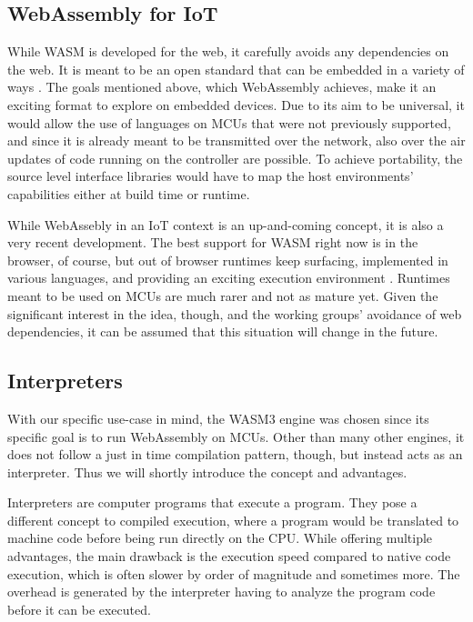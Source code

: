 \subsection{WebAssembly for IoT}

While WASM is developed for the web, it carefully avoids any dependencies on the web. It is meant to be an open standard that can be embedded in a variety of ways \autocite{noauthor_non-web_nodate}. The goals mentioned above, which WebAssembly achieves, make it an exciting format to explore on embedded devices. Due to its aim to be universal, it would allow the use of languages on MCUs that were not previously supported, and since it is already meant to be transmitted over the network, also over the air updates of code running on the controller are possible. To achieve portability, the source level interface libraries would have to map the host environments' capabilities either at build time or runtime.

While WebAssebly in an IoT context is an up-and-coming concept, it is also a very recent development. The best support for WASM right now is in the browser, of course, but out of browser runtimes keep surfacing, implemented in various languages, and providing an exciting execution environment \autocite{akinyemi_appcypherawesome-wasm-runtimes_2020}. Runtimes meant to be used on MCUs are much rarer and not as mature yet. Given the significant interest in the idea, though, and the working groups' avoidance of web dependencies, it can be assumed that this situation will change in the future.

\subsection{Interpreters}

With our specific use-case in mind, the WASM3 \autocite{noauthor_wasm3wasm3_2020} engine was chosen since its specific goal is to run WebAssembly on MCUs. Other than many other engines, it does not follow a just in time compilation pattern, though, but instead acts as an interpreter. Thus we will shortly introduce the concept and advantages.

Interpreters are computer programs that execute a program. They pose a different concept to compiled execution, where a program would be translated to machine code before being run directly on the CPU. While offering multiple advantages, the main drawback is the execution speed compared to native code execution, which is often slower by order of magnitude and sometimes more. The overhead is generated by the interpreter having to analyze the program code before it can be executed.

